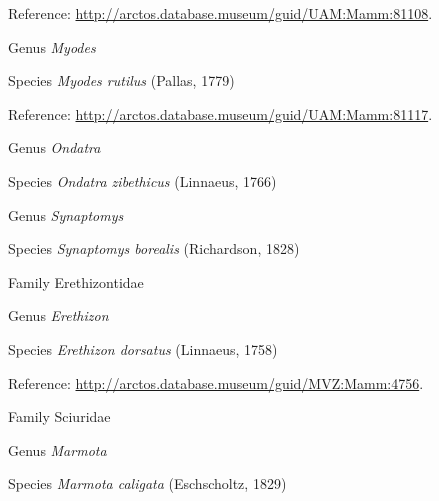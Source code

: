 \documentclass[9pt, article]{memoir}
\begin{document}
\begin{multicols}{2}
\vspace{6pt}Reference: 
\url{http://arctos.database.museum/guid/UAM:Mamm:81108}.

\vspace{6pt}\noindent\hspace{30pt}Genus \textit{Myodes}


\vspace{6pt}\noindent\hspace{36pt}Species \textit{Myodes rutilus} (Pallas, 1779)


\vspace{6pt}Reference: 
\url{http://arctos.database.museum/guid/UAM:Mamm:81117}.

\vspace{6pt}\noindent\hspace{30pt}Genus \textit{Ondatra}


\vspace{6pt}\noindent\hspace{36pt}Species \textit{Ondatra zibethicus} (Linnaeus, 1766)


\vspace{6pt}\noindent\hspace{30pt}Genus \textit{Synaptomys}


\vspace{6pt}\noindent\hspace{36pt}Species \textit{Synaptomys borealis} (Richardson, 1828)


\vspace{6pt}\noindent\hspace{24pt}Family Erethizontidae


\vspace{6pt}\noindent\hspace{30pt}Genus \textit{Erethizon}


\vspace{6pt}\noindent\hspace{36pt}Species \textit{Erethizon dorsatus} (Linnaeus, 1758)


\vspace{6pt}Reference: 
\url{http://arctos.database.museum/guid/MVZ:Mamm:4756}.

\vspace{6pt}\noindent\hspace{24pt}Family Sciuridae


\vspace{6pt}\noindent\hspace{30pt}Genus \textit{Marmota}


\vspace{6pt}\noindent\hspace{36pt}Species \textit{Marmota caligata} (Eschscholtz, 1829)



\end{multicols}
\end{document}
